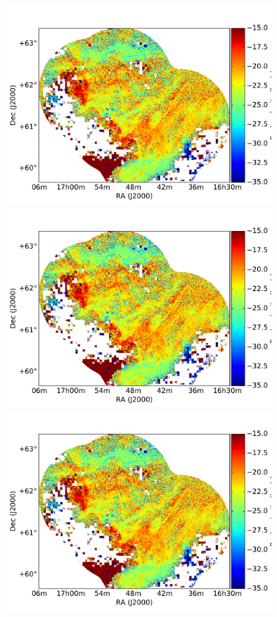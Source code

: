 \documentclass[traditabstract]{aa}
\begin{document}
\begin{figure}[h]
  \centering
  \includegraphics[page=1,height=7.5cm,trim=45 5 65 35,clip=true]{Figures/DHIGLS_velo.pdf}
  \hspace{3mm}
  \includegraphics[page=4,height=7.5cm,trim=45 5 65 35,clip=true]{Figures/DHIGLS_velo.pdf} \\
  \vspace{3mm}
  \includegraphics[page=2,height=7.5cm,trim=45 5 65 35,clip=true]{Figures/DHIGLS_velo.pdf}

\end{figure}
\end{document}
